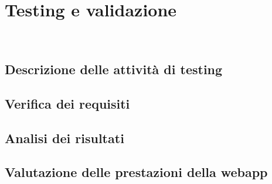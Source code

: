 \chapter{Testing e validazione}
\\
\section{Descrizione delle attività di testing}

\section{Verifica dei requisiti}

\section{Analisi dei risultati}

\section{Valutazione delle prestazioni della webapp}